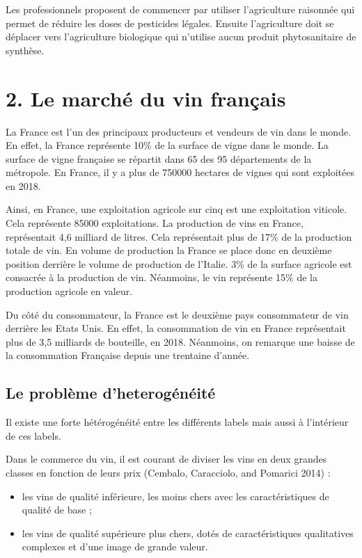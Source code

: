 \documentclass[11pt,]{article}
\providecommand{\tightlist}{%
  \setlength{\itemsep}{0pt}\setlength{\parskip}{0pt}}
\begin{document}
Les professionnels proposent de commencer par utiliser l'agriculture
raisonnée qui permet de réduire les doses de pesticides légales. Ensuite
l'agriculture doit se déplacer vers l'agriculture biologique qui
n'utilise aucun produit phytosanitaire de synthèse.

\hypertarget{le-marche-du-vin-francais}{%
\section{2. Le marché du vin français}\label{le-marche-du-vin-francais}}

La France est l'un des principaux producteurs et vendeurs de vin dans le
monde. En effet, la France représente 10\% de la surface de vigne dans
le monde. La surface de vigne française se répartit dans 65 des 95
départements de la métropole. En France, il y a plus de 750000 hectares
de vignes qui sont exploitées en 2018.

Ainsi, en France, une exploitation agricole sur cinq est une
exploitation viticole. Cela représente 85000 exploitations. La
production de vins en France, représentait 4,6 milliard de litres. Cela
représentait plus de 17\% de la production totale de vin. En volume de
production la France se place donc en deuxième position derrière le
volume de production de l'Italie. 3\% de la surface agricole est
consacrée à la production de vin. Néanmoins, le vin représente 15\% de
la production agricole en valeur.

Du côté du consommateur, la France est le deuxième pays consommateur de
vin derrière les Etats Unis. En effet, la consommation de vin en France
représentait plus de 3,5 milliards de bouteille, en 2018. Néanmoins, on
remarque une baisse de la consommation Française depuis une trentaine
d'année.

\hypertarget{le-probleme-dheterogeneite}{%
\subsection{Le problème
d'heterogénéité}\label{le-probleme-dheterogeneite}}

Il existe une forte hétérogénéité entre les différents labels mais aussi
à l'intérieur de ces labels.

Dans le commerce du vin, il est courant de diviser les vins en deux
grandes classes en fonction de leurs prix (Cembalo, Caracciolo, and
Pomarici 2014) :

\begin{itemize}
\tightlist
\item
  les vins de qualité inférieure, les moins chers avec les
  caractéristiques de qualité de base ;
\item
  les vins de qualité supérieure plus chers, dotés de caractéristiques
  qualitatives complexes et d'une image de grande valeur.
\end{itemize}
\end{document}
